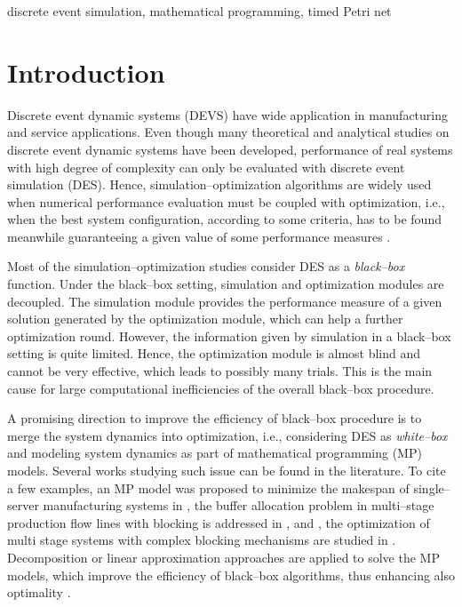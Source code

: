 \documentclass[suppldata]{interact}
\theoremstyle{plain}
\theoremstyle{definition}
\theoremstyle{remark}
\begin{document}
\begin{keywords}
discrete event simulation, mathematical programming, timed Petri net
\end{keywords}


\section{Introduction}

Discrete event dynamic systems (DEVS) have wide application in manufacturing and service applications. Even though many theoretical and analytical studies on discrete event dynamic systems have been developed, performance of real systems with high degree of complexity can only be evaluated with discrete event simulation (DES). Hence, simulation--optimization algorithms are widely used when numerical performance evaluation must be coupled with optimization, i.e., when the best system configuration, according to some criteria, has to be found meanwhile guaranteeing a given value of some performance measures \citep{fu20115book}.  

Most of the simulation--optimization studies consider DES as a \textit{black--box} function. Under the black--box setting, simulation and optimization modules are %
decoupled. The simulation module provides the performance measure of a given solution generated by the optimization module, which can help a further optimization round. However, the information given by simulation in a black--box setting is quite limited. Hence, the optimization module is almost blind and cannot be very effective, which leads to possibly many trials. This is the main cause for large computational inefficiencies of the overall black--box procedure.

A promising direction to improve the %
efficiency of black--box procedure is to merge the system dynamics into optimization, i.e., considering DES as \textit{white--box} and modeling system dynamics as part of mathematical programming (MP) models. Several works studying such issue can be found in the literature. To cite a few examples, an MP model was proposed to minimize the makespan of single--server manufacturing systems in \citep{di2020makespan}, the buffer allocation problem in multi--stage production flow lines with blocking is addressed in \citep{matta2008simulation}, \citep{weiss2015buffer} and \citep{alfieri2020time}, the optimization of multi stage systems with complex blocking mechanisms are studied in \citep{pedrielli2015integrated}. Decomposition or linear approximation approaches are applied to solve the MP models, %
which improve the efficiency of black--box algorithms, thus enhancing also optimality \citep{weiss2015buffer}\citep{alfieri2020time}. 
\end{document}
